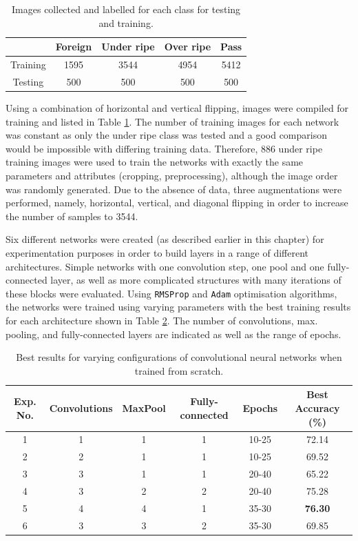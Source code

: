 \documentclass[fleqn,twoside,12pt]{report}
\begin{document}
\begin{table}[h]
	\centering
	\caption{Images collected and labelled for each class for testing and training.}
	\label{tab:data}
	\begin{tabular}{c c c c c} 
		\hline
		& Foreign & Under ripe & Over ripe & Pass \\ [0.5ex] 
		\hline
		Training & 1595 &  3544 & 4954 &  5412 \\
		Testing & 500 & 500 & 500 & 500 \\ [1ex] 
		\hline
	\end{tabular}
\end{table}



Using a combination of horizontal and vertical flipping, images were compiled for training and listed in Table \ref{tab:data}. The number of training images for each network was constant as only the under ripe class was tested and a good comparison would be impossible with differing training data. Therefore, 886 under ripe training images were used to train the networks with exactly the same parameters and attributes (cropping, preprocessing), although the image order was randomly generated. Due to the absence of data, three augmentations were performed, namely, horizontal, vertical, and diagonal flipping in order to increase the number of samples to 3544. 

Six different networks were created (as described earlier in this chapter) for experimentation purposes in order to build layers in a range of different architectures. Simple networks with one convolution step, one pool and one fully-connected layer, as well as more complicated structures with many iterations of these blocks were evaluated. Using \texttt{RMSProp} and \texttt{Adam} optimisation algorithms, the networks were trained using varying parameters with the best training results for each architecture shown in Table \ref{tab:networks}. The number of convolutions, max. pooling, and fully-connected layers are indicated as well as the range of epochs.



\begin{table}[h]
	\centering
	\caption{Best results for varying configurations of convolutional neural networks when trained from scratch.}
	\label{tab:networks}
	\begin{tabular}{cccccc} 
		\toprule
		Exp. No.  & Convolutions & MaxPool & Fully-connected & Epochs & Best Accuracy (\%) \\ [0.5ex] 
		\midrule
		1 & 1 & 1 & 1 & 10-25 & 72.14 \\
		2 & 2 & 1 & 1 & 10-25 & 69.52 \\
		3 & 3 & 1 & 1 & 20-40 & 65.22 \\
		4 & 3 & 2 & 2 & 20-40 & 75.28 \\
		5 & 4 & 4 & 1 & 35-30 & \textbf{76.30} \\
		6 & 3 & 3 & 2 & 35-30 & 69.85 \\
		\bottomrule
	\end{tabular}
\end{table}
\end{document}
